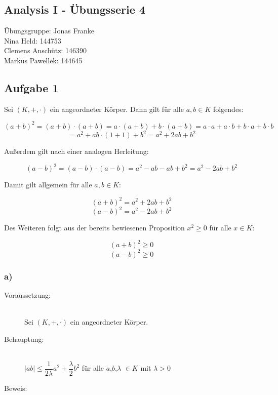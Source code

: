 \documentclass[11pt, a4paper]{article}
\begin{document}
	\begin{center} \section*{Analysis I - Übungsserie 4} \end{center}

	Übungsgruppe: Jonas Franke \\


	Nina Held: 144753 \\
	Clemens Anschütz: 146390 \\
	Markus Pawellek: 144645 \\


	\subsection*{Aufgabe 1}

	Sei $(K,+,\cdot)$ ein angeordneter Körper. Dann gilt für alle $a,b \in K$ folgendes:

	\[ (a+b)^2 = (a+b)\cdot (a+b) = a\cdot(a+b) + b\cdot(a+b) = a\cdot a + a\cdot b + b\cdot a + b\cdot b \]
	\[ = a^2 + ab\cdot(1+1) + b^2 = a^2 + 2ab + b^2 \]

	Außerdem gilt nach einer analogen Herleitung:

	\[ (a-b)^2 = (a-b)\cdot(a-b) = a^2 -ab - ab + b^2 = a^2 -2ab+b^2 \]

	Damit gilt allgemein für alle $a,b \in K$:

	\[ (a+b)^2 = a^2 + 2ab + b^2 \]
	\[ (a-b)^2 = a^2 - 2ab + b^2 \]

	Des Weiteren folgt aus der bereits bewiesenen Proposition $x^2 \geq 0$ für alle $x \in K$:

	\[ (a+b)^2 \geq 0 \]
	\[ (a-b)^2 \geq 0 \]


	\subsubsection*{ a)}

		\begin{description}
			\item[Voraussetzung:] \hfill \\
				Sei $(K,+,\cdot)$ ein angeordneter Körper. \hfill 
			\item[Behauptung:] \hfill \\
				$|ab| \leq \dfrac{1}{2\lambda}a^2 + \dfrac{\lambda}{2}b^2$ für alle $a$,$b$,$\lambda$ $\in K$ mit $\lambda > 0$ \hfill 
			\item[Beweis:] 
		\end{description}
\end{document}
